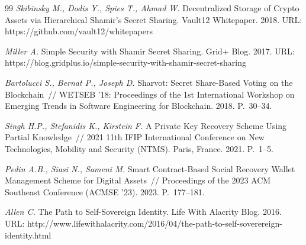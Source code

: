 \begin{thebibliography}{99}
 \textit{Skibinsky M., Dodis Y., Spies T., Ahmad W.} Decentralized Storage of Crypto Assets via Hierarchical Shamir's Secret Sharing. Vault12 Whitepaper. 2018. URL: https://github.com/vault12/whitepapers

 \textit{Miller A.} Simple Security with Shamir Secret Sharing. Grid+ Blog. 2017. URL: https://blog.gridplus.io/simple-security-with-shamir-secret-sharing

 \textit{Bartolucci S., Bernat P., Joseph D.} Sharvot: Secret Share-Based Voting on the Blockchain~// WETSEB '18: Proceedings of the 1st International Workshop on Emerging Trends in Software Engineering for Blockchain. 2018. P.~30--34.

 \textit{Singh H.P., Stefanidis K., Kirstein F.} A Private Key Recovery Scheme Using Partial Knowledge~// 2021 11th IFIP International Conference on New Technologies, Mobility and Security (NTMS). Paris, France. 2021. P.~1--5.

 \textit{Pedin A.B., Siasi N., Sameni M.} Smart Contract-Based Social Recovery Wallet Management Scheme for Digital Assets~// Proceedings of the 2023 ACM Southeast Conference (ACMSE '23). 2023. P.~177--181.

 \textit{Allen C.} The Path to Self-Sovereign Identity. Life With Alacrity Blog. 2016. URL: http://www.lifewithalacrity.com/2016/04/the-path-to-self-soverereign-identity.html

\end{thebibliography}

